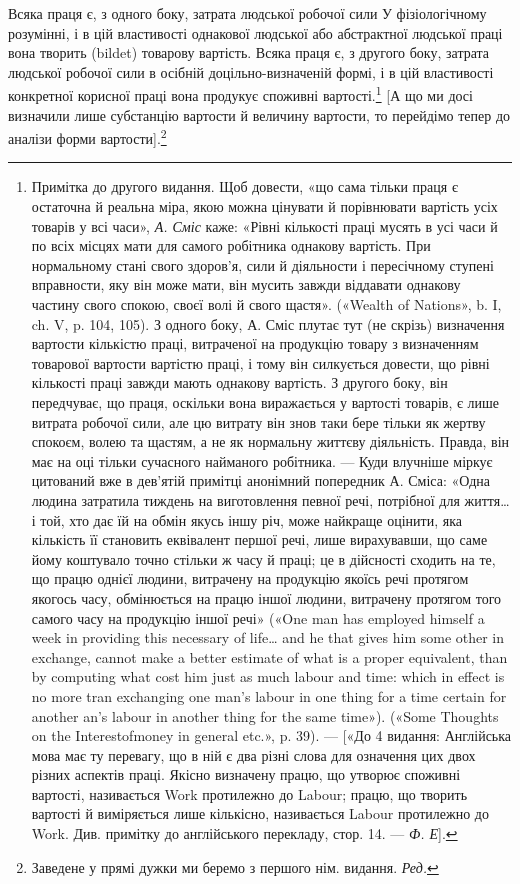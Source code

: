 Всяка праця є, з одного боку, затрата людської робочої сили
У фізіологічному розумінні, і в цій властивості однакової людської
або абстрактної людської праці вона творить (bildet) товарову
вартість. Всяка праця є, з другого боку, затрата людської робочої
сили в осібній доцільно-визначеній формі, і в цій властивості
конкретної корисної праці вона продукує споживні вартості.\footnote{
Примітка до другого видання. Щоб довести, «що сама тільки праця є
остаточна й реальна міра, якою можна цінувати й порівнювати вартість
усіх товарів у всі часи», \emph{А. Сміс} каже: «Рівні кількості праці мусять в
усі часи й по всіх місцях мати для самого робітника однакову вартість.
При нормальному стані свого здоров'я, сили й діяльности і пересічному
ступені вправности, яку він може мати, він мусить завжди віддавати однакову
частину свого спокою, своєї волі й свого щастя». («Wealth of Nations»,
b. I, ch. V, p. 104, 105). З одного боку, А. Сміс плутає тут (не скрізь)
визначення вартости кількістю праці, витраченої на продукцію товару
з визначенням товарової вартости вартістю праці, і тому він силкується
довести, що рівні кількості праці завжди мають однакову вартість. З другого
боку, він передчуває, що праця, оскільки вона виражається у вартості
товарів, є лише витрата робочої сили, але цю витрату він знов таки
бере тільки як жертву спокоєм, волею та щастям, а не як нормальну життєву
діяльність. Правда, він має на оці тільки сучасного найманого робітника.
— Куди влучніше міркує цитований вже в дев’ятій примітці анонімний
попередник А. Сміса: «Одна людина затратила тиждень на виготовлення
певної речі, потрібної для життя\dots{} і той, хто дає їй на обмін якусь
іншу річ, може найкраще оцінити, яка кількість її становить еквівалент
першої речі, лише вирахувавши, що саме йому коштувало точно стільки ж
часу й праці; це в дійсності сходить на те, що працю однієї людини, витрачену
на продукцію якоїсь речі протягом якогось часу, обмінюється
на працю іншої людини, витрачену протягом того самого часу на продукцію
іншої речі» («One man has employed himself a week in providing this
necessary of life\dots{} and he that gives him some other in exchange, cannot
make a better estimate of what is a proper equivalent, than by computing what
cost him just as much labour and time: which in effect is no more tran exchanging
one man’s labour in one thing for a time certain for another an’s labour
in another thing for the same time»). («Some Thoughts on the Interestofmoney
in general etc.», p. 39). — [«До 4 видання: Англійська мова має
ту перевагу, що в ній є два різні слова для означення цих двох різних аспектів
праці. Якісно визначену працю, що утворює споживні вартості,
називається Work протилежно до Labour; працю, що творить вартості
й виміряється лише кількісно, називається Labour протилежно до Work.
Див. примітку до англійського перекладу, стор. 14. — \emph{Ф. Е}].}
[А що ми досі визначили лише субстанцію вартости й величину
вартости, то перейдімо тепер до аналізи форми вартости].\footnote*{
Заведене у прямі дужки ми беремо з першого нім. видання. \emph{Ред.}
}

